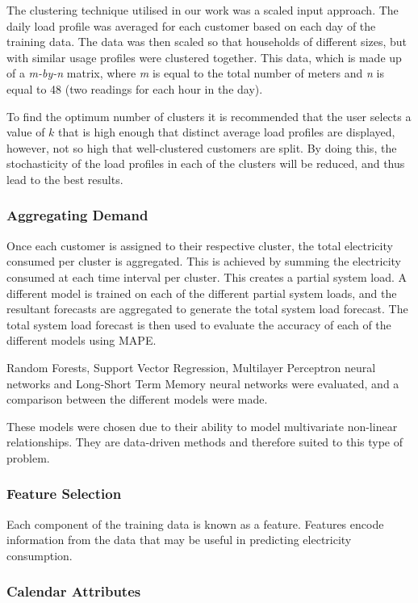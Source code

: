 The clustering technique utilised in our work was a scaled input approach. The daily load profile was averaged for each customer based on each day of the training data. The data was then scaled so that households of different sizes, but with similar usage profiles were clustered together. This data, which is made up of a \textit{m-by-n} matrix, where \textit{m} is equal to the total number of meters and \textit{n} is equal to 48 (two readings for each hour in the day).

To find the optimum number of clusters it is recommended that the user selects a value of $k$ that is high enough that distinct average load profiles are displayed, however, not so high that well-clustered customers are split. By doing this, the stochasticity of the load profiles in each of the clusters will be reduced, and thus lead to the best results.


\subsubsection{Aggregating Demand}

Once each customer is assigned to their respective cluster, the total electricity consumed per cluster is aggregated. This is achieved by summing the electricity consumed at each time interval per cluster. This creates a partial system load. A different model is trained on each of the different partial system loads, and the resultant forecasts are aggregated to generate the total system load forecast. The total system load forecast is then used to evaluate the accuracy of each of the different models using MAPE. 

Random Forests, Support Vector Regression, Multilayer Perceptron neural networks and Long-Short Term Memory neural networks were evaluated, and a comparison between the different models were made. 

These models were chosen due to their ability to model multivariate non-linear relationships. They are data-driven methods and therefore suited to this type of problem.

\subsubsection{Feature Selection}

Each component of the training data is known as a feature. Features encode information from the data that may be useful in predicting electricity consumption. 

\subsubsection{Calendar Attributes}

